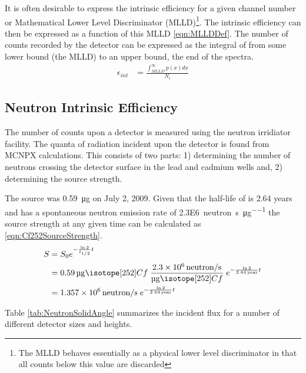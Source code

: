 \documentclass[draftcls,onecolumn]{IEEEtran}
\begin{document}
It is often desirable to express the intrinsic efficiency for a given channel number or Mathematical Lower Level Discriminator (MLLD)\footnote{The MLLD behaves essentially as a physical lower level discriminator in that all counts below this value are discarded}.
The intrinsic efficiency can then be expressed as a function of this MLLD \eqref{eqn:MLLDDef}.
The number of counts recorded by the detector can be expressed as the integral of  from some lower bound (the MLLD) to an upper bound, the end of the spectra.
\begin{align}
	\label{eqn:MLLDDef}
	\epsilon_{int} &= \frac{\int_{MLLD}^\infty p(x)dx}{N_i}
\end{align}

\subsection{Neutron Intrinsic Efficiency}
The number of counts upon a detector is measured using the neutron irridiator facility.
The quanta of radiation incident upon the detector is found from MCNPX calculations.
This consists of two parts: 1) determining the number of neutrons crossing the detector surface in the lead and cadmium wells and, 2) determining the source strength.

The  source was \SI{0.59}{\ug} on July 2, 2009.
Given that the half-life of  is 2.64 years and  has a spontaneous neutron emission rate of \SI{2.3E6}{neutron\per\second\per\micro\gram} the source strength at any given time can be calculated as \eqref{eqn:Cf252SourceStrength}.
\begin{align}
  \label{eqn:Cf252SourceStrength}
  S &= S_0 e^{-\frac{\ln{2}}{t_{1/2}} t} \\ \notag 
    &= \SI{0.59}{\ug} \iso[252]{Cf} \;\frac{\SI{2.3E6}{neutron\per\second}}{\si{\ug} \iso[252]{Cf}}\; e^{-\frac{ \ln{2}}{\SI{2.64}{year}}t}  \\ \notag
    &= \SI{1.357E6}{neutron\per\second}\; e^{-\frac{ \ln{2}}{\SI{2.64}{year}}t} 
\end{align}

Table \ref{tab:NeutronSolidAngle} summarizes the incident flux for a number of different detector sizes and heights.
\end{document}
